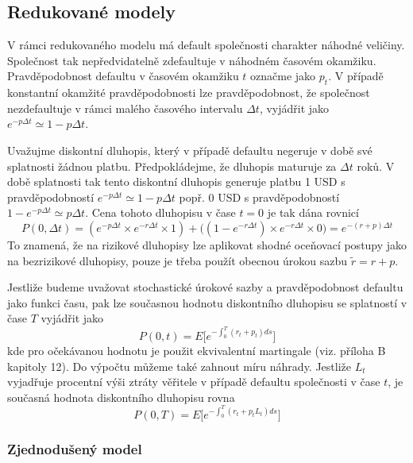 \documentclass[a4paper]{book}
\begin{document}
\subsection{Redukované modely}

V rámci redukovaného modelu má default společnosti charakter náhodné veličiny. Společnost tak nepředvidatelně zdefaultuje v náhodném časovém okamžiku. Pravděpodobnost defaultu v časovém okamžiku $t$ označme jako $p_t$. V případě konstantní okamžité pravděpodobnosti lze pravděpodobnost, že společnost nezdefaultuje v rámci malého časového intervalu $\Delta t$, vyjádřit jako $e^{-p \Delta t} \simeq 1 - p \Delta t$.

Uvažujme diskontní dluhopis, který v případě defaultu negeruje v době své splatnosti žádnou platbu. Předpokládejme, že dluhopis maturuje za $\Delta t$ roků. V době splatnosti tak tento diskontní dluhopis generuje platbu 1 USD s pravděpodobností $e^{-p \Delta t} \simeq 1 - p \Delta t$ popř. 0 USD s pravděpodobností $1 - e^{-p \Delta t} \simeq p \Delta t$. Cena tohoto dluhopisu v čase $t = 0$ je tak dána rovnicí
\begin{equation*}
P(0, \Delta t) = (e^{-p \Delta t} \times e^{-r \Delta t} \times 1) + \big( (1 - e^{-r \Delta t}) \times e^{-r \Delta t}\times 0 \big) = e^{-(r+p)\Delta t}
\end{equation*}
To znamená, že na rizikové dluhopisy lze aplikovat shodné oceňovací postupy jako na bezrizikové dluhopisy, pouze je třeba použít obecnou úrokou sazbu $\tilde{r} = r + p$.

Jestliže budeme uvažovat stochastické úrokové sazby a pravděpodobnost defaultu jako funkci času, pak lze současnou hodnotu diskontního dluhopisu se splatností v čase $T$ vyjádřit jako
\begin{equation*}
P(0,t) = E \Big[ e^{-\int_0^T (r_t + p_t)ds}\Big]
\end{equation*}
kde pro očekávanou hodnotu je použit ekvivalentní martingale (viz. příloha B kapitoly 12). Do výpočtu můžeme také zahnout míru náhrady. Jestliže $L_t$ vyjadřuje procentní výši ztráty věřitele v případě defaultu společnosti v čase $t$, je současná hodnota diskontního dluhopisu rovna
\begin{equation*}
P(0,T) = E \Big[ e^{-\int_0^T (r_t + p_t L_t)ds}\Big]
\end{equation*}

\subsubsection{Zjednodušený model}
\end{document}
